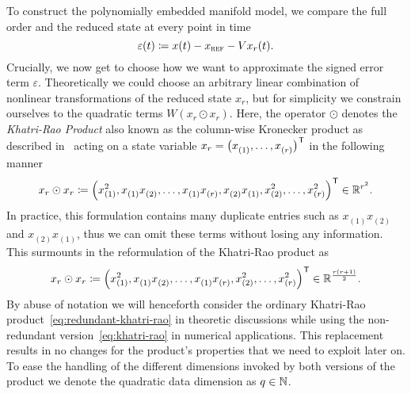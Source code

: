 To construct the polynomially embedded manifold model, we compare the full order and the reduced state at every point in time
\begin{equation*}
    \varepsilon(t) \coloneqq x(t) - x_{\textnormal{\scshape ref}} - V x_r(t).
\end{equation*}
Crucially, we now get to choose how we want to approximate the signed error term $\varepsilon$.
Theoretically we could choose an arbitrary linear combination of nonlinear transformations of the reduced state $x_r$, but for simplicity we constrain ourselves to the quadratic terms $W (x_r \odot x_r)$.
Here, the operator $\odot$ denotes the \emph{Khatri-Rao Product} also known as the column-wise Kronecker product as described in~\cite{Slyusar1999, Shuangzhe2008, Favier2021} acting on a state variable $x_r = {\big( x_{(1)}^{\phantom{1}}, \dots, x_{(r)}^{\phantom{1}} \big)}^{\mkern1mu \mathsf{T}}$ in the following manner
\begin{equation}\label{eq:redundant-khatri-rao}
    x_r \odot x_r \coloneqq {\left( x_{(1)}^2, x_{(1)}^{\phantom{1}} x_{(2)}^{\phantom{1}}, \dots, x_{(1)}^{\phantom{1}} x_{(r)}^{\phantom{1}}, x_{(2)}^{\phantom{1}} x_{(1)}^{\phantom{1}}, x_{(2)}^2, \dots, x_{(r)}^2 \right)}^{\mkern1mu \mathsf{T}} \in \mathbb{R}^{r^2}.
\end{equation}
In practice, this formulation contains many duplicate entries such as $x_{(1)}^{\phantom{1}} x_{(2)}^{\phantom{1}}$ and $x_{(2)}^{\phantom{1}} x_{(1)}^{\phantom{1}}$, thus we can omit these terms without losing any information.
This surmounts in the reformulation of the Khatri-Rao product as
\begin{equation}\label{eq:khatri-rao}
    x_r \odot x_r \coloneqq {\left( x_{(1)}^2, x_{(1)}^{\phantom{1}} x_{(2)}^{\phantom{1}}, \dots, x_{(1)}^{\phantom{1}} x_{(r)}^{\phantom{1}}, x_{(2)}^2, \dots, x_{(r)}^2 \right)}^{\mkern1mu \mathsf{T}} \in \mathbb{R}^{\frac{r (r + 1)}{2}}.
\end{equation}
By abuse of notation we will henceforth consider the ordinary Khatri-Rao product~\eqref{eq:redundant-khatri-rao} in theoretic discussions while using the non-redundant version~\eqref{eq:khatri-rao} in numerical applications.
This replacement results in no changes for the product's properties that we need to exploit later on.
To ease the handling of the different dimensions invoked by both versions of the product we denote the quadratic data dimension as $q \in \mathbb{N}$.


